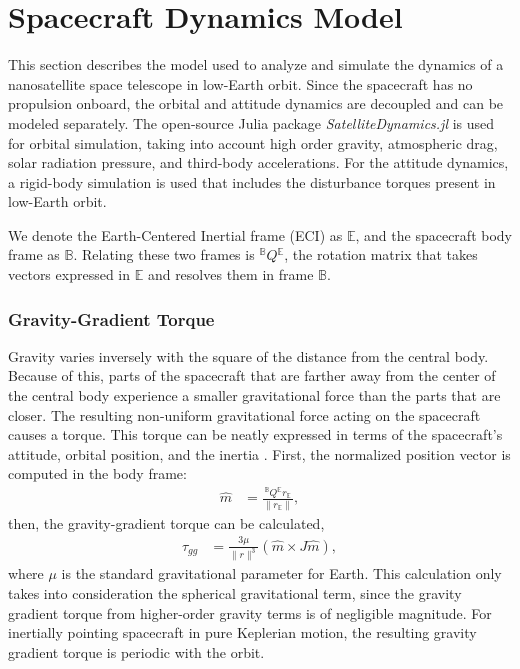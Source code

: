 \section{Spacecraft Dynamics Model}
\label{sec:wigglesat:simenv}
This section describes the model used to analyze and simulate the dynamics of a nanosatellite space telescope in low-Earth orbit. Since the spacecraft has no propulsion onboard, the orbital and attitude dynamics are decoupled and can be modeled separately. The open-source Julia package \textit{SatelliteDynamics.jl} is used for orbital simulation, taking into account high order gravity, atmospheric drag, solar radiation pressure, and third-body accelerations. For the attitude dynamics, a rigid-body simulation is used that includes the disturbance torques present in low-Earth orbit. 

We denote the Earth-Centered Inertial frame (ECI) as $\mathbb{E}$, and the spacecraft body frame as $\mathbb{B}$. Relating these two frames is ${}^{\mathbb{B}} Q {}^{\mathbb{E}}$, the rotation matrix that takes vectors expressed in $\mathbb{E}$ and resolves them in frame $\mathbb{B}$.
\subsubsection{Gravity-Gradient Torque}
Gravity varies inversely with the square of the distance from the central body. Because of this, parts of the spacecraft that are farther away from the center of the central body experience a smaller gravitational force than the parts that are closer. The resulting non-uniform gravitational force acting on the spacecraft causes a torque. This torque can be neatly expressed in terms of the spacecraft's attitude, orbital position, and the inertia \cite{markley2014,wertz1978}. First, the normalized position vector is computed in the body frame:
\begin{align}
    \hat{m} &= \frac{{}^{\mathbb{B}} Q {}^{\mathbb{E}} r_{\mathbb{E}}}{\|r_{\mathbb{E}}\|},
\end{align}
then, the gravity-gradient torque can be calculated, 
\begin{align}
    \tau_{gg} &= \frac{3 \mu}{\|r\|^3}(\hat{m} \times J\hat{m}),
\end{align}
where $\mu$ is the standard gravitational parameter for Earth. This calculation only takes into consideration the spherical gravitational term, since the gravity gradient torque from higher-order gravity terms is of negligible magnitude.  For inertially pointing spacecraft in pure Keplerian motion, the resulting gravity gradient torque is periodic with the orbit.

